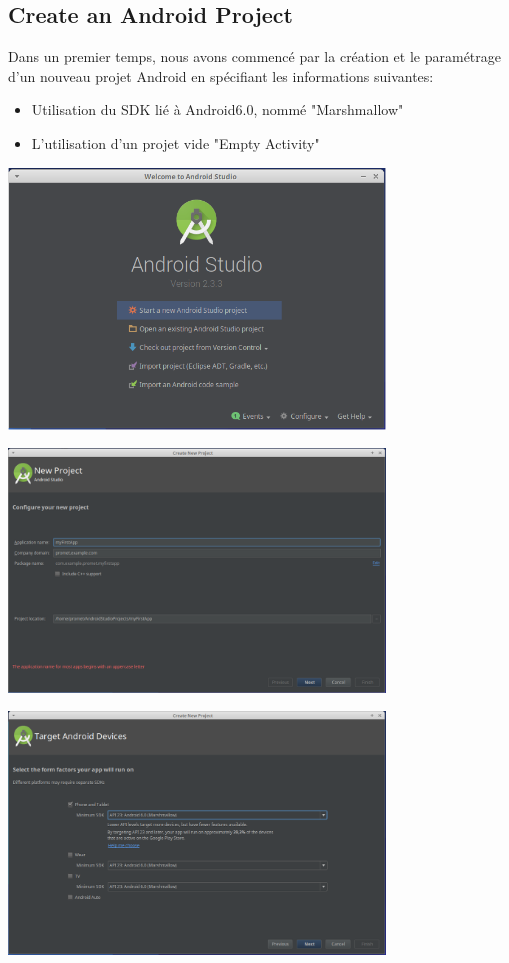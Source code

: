\documentclass[french,a4paper,12pt]{report}
\begin{document}
\subsection{Create an Android Project}
Dans un premier temps, nous avons commencé par la création et le paramétrage
d'un nouveau projet Android en spécifiant les informations suivantes:
\begin{itemize}
  \item Utilisation du SDK lié à Android6.0, nommé "Marshmallow"
  \item L'utilisation d'un projet vide "Empty Activity"
\end{itemize}
\includegraphics[width=10cm]{1strartNewProject.png}

\includegraphics[width=10cm]{2congProj.png}

\includegraphics[width=10cm]{3Sdk.png}
\end{document}
